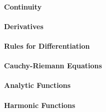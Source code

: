 \paragraph{Continuity}

\paragraph{Derivatives}

\paragraph{Rules for Differentiation}

\paragraph{Cauchy-Riemann Equations}

\paragraph{Analytic Functions}

\paragraph{Harmonic Functions}


